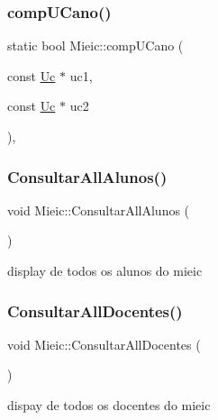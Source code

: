 \hypertarget{class_mieic_ac14d5a81f95fff4d2b5ecb796e61ce15}{}\label{class_mieic_ac14d5a81f95fff4d2b5ecb796e61ce15} 
\subsubsection{\texorpdfstring{comp\+U\+Cano()}{compUCano()}}
{\footnotesize\ttfamily static bool Mieic\+::comp\+U\+Cano (\begin{DoxyParamCaption}\item[{const \hyperlink{class_uc}{Uc} $\ast$}]{uc1,  }\item[{const \hyperlink{class_uc}{Uc} $\ast$}]{uc2 }\end{DoxyParamCaption})\hspace{0.3cm}{\ttfamily [inline]}, {\ttfamily [static]}}

\hypertarget{class_mieic_a07578c2654ea5c90b4b5951c9c5767a5}{}\label{class_mieic_a07578c2654ea5c90b4b5951c9c5767a5} 
\subsubsection{\texorpdfstring{Consultar\+All\+Alunos()}{ConsultarAllAlunos()}}
{\footnotesize\ttfamily void Mieic\+::\+Consultar\+All\+Alunos (\begin{DoxyParamCaption}{ }\end{DoxyParamCaption})}

display de todos os alunos do mieic \hypertarget{class_mieic_a7d3eaad857da76b008598ac91f752068}{}\label{class_mieic_a7d3eaad857da76b008598ac91f752068} 
\subsubsection{\texorpdfstring{Consultar\+All\+Docentes()}{ConsultarAllDocentes()}}
{\footnotesize\ttfamily void Mieic\+::\+Consultar\+All\+Docentes (\begin{DoxyParamCaption}{ }\end{DoxyParamCaption})}

dispay de todos os docentes do mieic \hypertarget{class_mieic_ad95395acfad5cfa67c7b1c8be4639935}{}\label{class_mieic_ad95395acfad5cfa67c7b1c8be4639935} 
